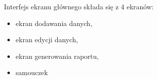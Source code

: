 Interfejs ekranu głównego składa się z 4 ekranów: \begin{itemize}
    \item ekran dodawania danych,
    \item ekran edycji danych,
    \item ekran generowania raportu,
    \item samouczek
\end{itemize}